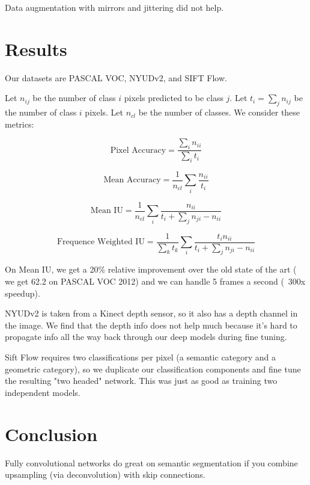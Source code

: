 \documentclass[a4paper]{article}
\begin{document}
Data augmentation with mirrors and jittering did not help.

\section{Results}
Our datasets are PASCAL VOC, NYUDv2, and SIFT Flow.

Let $n_{ij}$ be the number of class $i$ pixels predicted to be class $j$.
Let $t_i = \sum_{j} n_{ij}$ be the number of class $i$ pixels. Let $n_{cl}$ be
the number of classes. We consider these metrics:

$$
\textrm{Pixel Accuracy} = \frac{\sum_{i}{n_{ii}}}{\sum_{i}{t_i}}
$$

$$
\textrm{Mean Accuracy} = \frac{1}{n_{cl}} \sum_{i}{\frac{n_{ii}}{t_i}}
$$

$$
\textrm{Mean IU} = \frac{1}{n_{cl}} \sum_{i}{\frac{n_{ii}}{
t_i + \sum_{j}{n_{ji} - n_{ii}}
}}
$$

$$
\textrm{Frequence Weighted IU} = \frac{1}{\sum_{k}{t_k}} \sum_{i}{\frac{
t_i n_{ii}
}{
t_i + \sum_{j}{n_{ji} - n_{ii}}
}}
$$

On Mean IU, we get a 20\% relative improvement over the old state of the art (
we get 62.2 on PASCAL VOC 2012) and we can handle 5 frames a second (~300x
speedup).

NYUDv2 is taken from a Kinect depth sensor, so it also has a depth channel in
the image. We find that the depth info does not help much because it's hard to
propagate info all the way back through our deep models during fine tuning.

Sift Flow requires two classifications per pixel (a semantic category and a
geometric category), so we duplicate our classification components and fine
tune the resulting "two headed" network. This was just as good as training two
independent models.

\section{Conclusion}
Fully convolutional networks do great on semantic segmentation if you combine
upsampling (via deconvolution) with skip connections.
\end{document}
